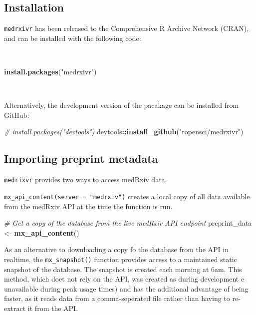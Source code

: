 \documentclass[a4paper, twoside]{templates/ociamthesis}
\newenvironment{Shaded}{\begin{snugshade}}{\end{snugshade}}
\newcommand{\CommentTok}[1]{\textcolor[rgb]{0.56,0.35,0.01}{\textit{#1}}}
\newcommand{\KeywordTok}[1]{\textcolor[rgb]{0.13,0.29,0.53}{\textbf{#1}}}
\newcommand{\NormalTok}[1]{#1}
\newcommand{\OperatorTok}[1]{\textcolor[rgb]{0.81,0.36,0.00}{\textbf{#1}}}
\newcommand{\StringTok}[1]{\textcolor[rgb]{0.31,0.60,0.02}{#1}}
\renewenvironment{Shaded}
{
  \vspace{4pt}%
  \begin{snugshade}%
}{%
  \end{snugshade}%
  \vspace{4pt}%
}
\begin{document}
\hypertarget{installation}{%
\subsection{Installation}\label{installation}}

\texttt{medrxivr} has been released to the Comprehensive R Archive Network (CRAN), and can be installed with the following code:

~

\begin{Shaded}
\begin{Highlighting}[]
\KeywordTok{install.packages}\NormalTok{(}\StringTok{"medrxivr"}\NormalTok{)}
\end{Highlighting}
\end{Shaded}

~

Alternatively, the development version of the pacakage can be installed from GitHub:

\begin{Shaded}
\begin{Highlighting}[]
\CommentTok{# install.packages("devtools") }
\NormalTok{devtools}\OperatorTok{::}\KeywordTok{install_github}\NormalTok{(}\StringTok{"ropensci/medrxivr"}\NormalTok{)}
\end{Highlighting}
\end{Shaded}

\hypertarget{importing-preprint-metadata}{%
\subsection{Importing preprint metadata}\label{importing-preprint-metadata}}

\texttt{medrixvr} provides two ways to access medRxiv data.

\texttt{mx\_api\_content(server\ =\ "medrxiv")} creates a local copy of all data available from the medRxiv API at the time the function is run.

\begin{Shaded}
\begin{Highlighting}[]
\CommentTok{# Get a copy of the database from the live medRxiv API endpoint}
\NormalTok{preprint_data <-}\StringTok{ }\KeywordTok{mx_api_content}\NormalTok{()  }
\end{Highlighting}
\end{Shaded}

As an alternative to downloading a copy fo the database from the API in realtime, the \texttt{mx\_snapshot()} function provides access to a maintained static snapshot of the database. The snapshot is created each morning at 6am. This method, which doet not rely on the API, was created as during development e unavailable during peak usage times) and has the additional advantage of being faster, as it reads data from a comma-seperated file rather than having to re-extract it from the API.
\end{document}
